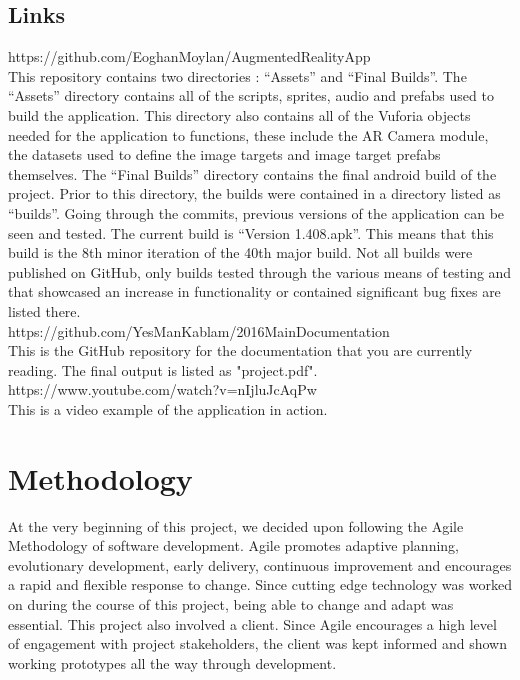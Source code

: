 \section{Links}
https://github.com/EoghanMoylan/AugmentedRealityApp \\
This repository contains two directories :  “Assets” and “Final Builds”. The “Assets” directory contains all of the scripts, sprites, audio and prefabs used to build the application. This directory also contains all of the Vuforia objects needed for the application to functions, these include the AR Camera module, the datasets used to define the image targets and image target prefabs themselves.
The “Final Builds” directory contains the final android build of the project. Prior to this directory, the builds were contained in a directory listed as “builds”. Going through the commits, previous versions of the application can be seen and tested. The current build is “Version 1.408.apk”. This means that this build is the  8th minor iteration of the 40th major build. Not all builds were published on GitHub, only builds tested through the various means of testing and that showcased an increase in functionality or contained significant bug fixes are listed there.\\

https://github.com/YesManKablam/2016MainDocumentation \\
This is the GitHub repository for the documentation that you are currently reading. The final output is listed as "project.pdf".\\

https://www.youtube.com/watch?v=nIjluJcAqPw\\
This is a video example of the application in action.


\chapter{Methodology}
At the very beginning of this project, we decided upon following the Agile Methodology of software development. Agile promotes adaptive planning, evolutionary development, early delivery, continuous improvement and encourages a rapid and flexible response to change. Since cutting edge technology was worked on during the course of this project, being able to change and adapt was essential. This project also involved a client. Since Agile encourages a high level of engagement with project stakeholders, the client was kept informed and shown working prototypes all the way through development.

